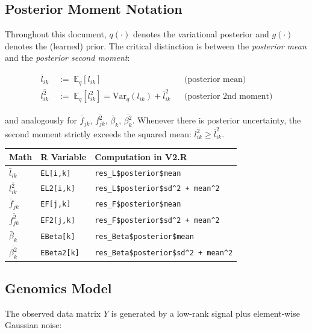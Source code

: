 \documentclass[11pt]{article}
\newcommand{\lbar}[2]{\bar{l}_{#1#2}}
\newcommand{\fbar}[2]{\bar{f}_{#1#2}}
\newcommand{\betabar}[1]{\bar{\beta}_{#1}}
\newcommand{\lsec}[2]{\overline{l^2_{#1#2}}}
\newcommand{\fsec}[2]{\overline{f^2_{#1#2}}}
\newcommand{\betasec}[1]{\overline{\beta^2_{#1}}}
\newcommand{\coderef}[1]{{\color{blue!70!black}\texttt{#1}}}
\begin{document}
\subsection{Posterior Moment Notation}\label{sec:moments}

Throughout this document, $q(\cdot)$ denotes the variational posterior and
$g(\cdot)$ denotes the (learned) prior.  The critical distinction is between
the \emph{posterior mean} and the \emph{posterior second moment}:

\begin{align}
  \lbar{i}{k} &\;:=\; \mathbb{E}_q[l_{ik}]
  &&\text{(posterior mean)} \label{eq:post-mean-l} \\
  \lsec{i}{k} &\;:=\; \mathbb{E}_q[l_{ik}^2]
               = \mathrm{Var}_q(l_{ik}) + \lbar{i}{k}^2
  &&\text{(posterior 2nd moment)} \label{eq:post-sec-l}
\end{align}

and analogously for $\fbar{j}{k}$, $\fsec{j}{k}$, $\betabar{k}$,
$\betasec{k}$.  Whenever there is posterior uncertainty, the second moment
strictly exceeds the squared mean:
$\lsec{i}{k} \geq \lbar{i}{k}^2$.

\begin{codebox}
\begin{tabular}{lll}
\textbf{Math} & \textbf{R Variable} & \textbf{Computation in V2.R} \\
\midrule
$\lbar{i}{k}$ & \coderef{EL[i,k]} & \coderef{res\_L\$posterior\$mean} \\
$\lsec{i}{k}$ & \coderef{EL2[i,k]} & \coderef{res\_L\$posterior\$sd\^{}2 + mean\^{}2} \\
$\fbar{j}{k}$ & \coderef{EF[j,k]} & \coderef{res\_F\$posterior\$mean} \\
$\fsec{j}{k}$ & \coderef{EF2[j,k]} & \coderef{res\_F\$posterior\$sd\^{}2 + mean\^{}2} \\
$\betabar{k}$ & \coderef{EBeta[k]} & \coderef{res\_Beta\$posterior\$mean} \\
$\betasec{k}$ & \coderef{EBeta2[k]} & \coderef{res\_Beta\$posterior\$sd\^{}2 + mean\^{}2} \\
\end{tabular}
\end{codebox}

\subsection{Genomics Model}

The observed data matrix $Y$ is generated by a low-rank signal plus
element-wise Gaussian noise:
\end{document}
